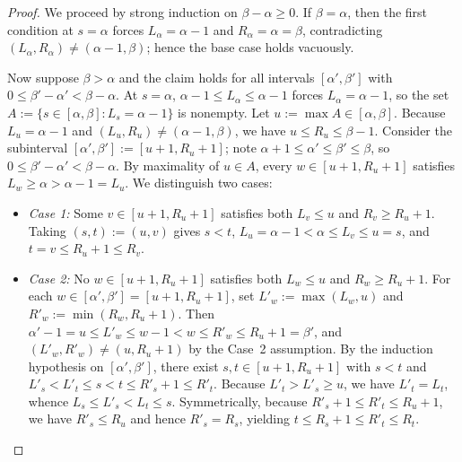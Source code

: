 \documentclass[11pt]{article}
\theoremstyle{definition}
\theoremstyle{remark}
\begin{document}
\begin{proof}
We proceed by strong induction on $\beta - \alpha \ge 0$. If $\beta = \alpha$, then the first condition at $s = \alpha$ forces $L_\alpha = \alpha - 1$ and $R_\alpha = \alpha = \beta$, contradicting $(L_\alpha, R_\alpha) \ne (\alpha - 1, \beta)$; hence the base case holds vacuously.

Now suppose $\beta > \alpha$ and the claim holds for all intervals $[\alpha', \beta']$ with $0 \le \beta' - \alpha' < \beta - \alpha$. At $s = \alpha$, $\alpha - 1 \le L_\alpha \le \alpha - 1$ forces $L_\alpha = \alpha - 1$, so the set $A := \{s \in [\alpha, \beta] : L_s = \alpha - 1\}$ is nonempty. Let $u := \max A \in [\alpha, \beta]$. Because $L_u = \alpha - 1$ and $(L_u, R_u) \ne (\alpha - 1, \beta)$, we have $u \le R_u \le \beta - 1$. Consider the subinterval $[\alpha', \beta'] := [u + 1, R_u + 1]$; note $\alpha + 1 \le \alpha' \le \beta' \le \beta$, so $0 \le \beta' - \alpha' < \beta - \alpha$. By maximality of $u \in A$, every $w \in [u + 1, R_u + 1]$ satisfies $L_w \ge \alpha > \alpha - 1 = L_u$. We distinguish two cases:
\begin{itemize}[leftmargin=2em,nosep]
  \item \emph{Case 1:} Some $v \in [u + 1, R_u + 1]$ satisfies both $L_v \le u$ and $R_v \ge R_u + 1$. Taking $(s, t) := (u, v)$ gives $s < t$, $L_u = \alpha - 1 < \alpha \le L_v \le u = s$, and $t = v \le R_u + 1 \le R_v$.
  \item \emph{Case 2:} No $w \in [u + 1, R_u + 1]$ satisfies both $L_w \le u$ and $R_w \ge R_u + 1$. For each $w \in [\alpha', \beta'] = [u + 1, R_u + 1]$, set $L'_w := \max(L_w, u)$ and $R'_w := \min(R_w, R_u + 1)$. Then $\alpha' - 1 = u \le L'_w \le w - 1 < w \le R'_w \le R_u + 1 = \beta'$, and $(L'_w, R'_w) \ne (u, R_u + 1)$ by the Case~2 assumption. By the induction hypothesis on $[\alpha', \beta']$, there exist $s, t \in [u + 1, R_u + 1]$ with $s < t$ and $L'_s < L'_t \le s < t \le R'_s + 1 \le R'_t$. Because $L'_t > L'_s \ge u$, we have $L'_t = L_t$, whence $L_s \le L'_s < L_t \le s$. Symmetrically, because $R'_s + 1 \le R'_t \le R_u + 1$, we have $R'_s \le R_u$ and hence $R'_s = R_s$, yielding $t \le R_s + 1 \le R'_t \le R_t$. \qedhere
\end{itemize}
\end{proof}
\end{document}
